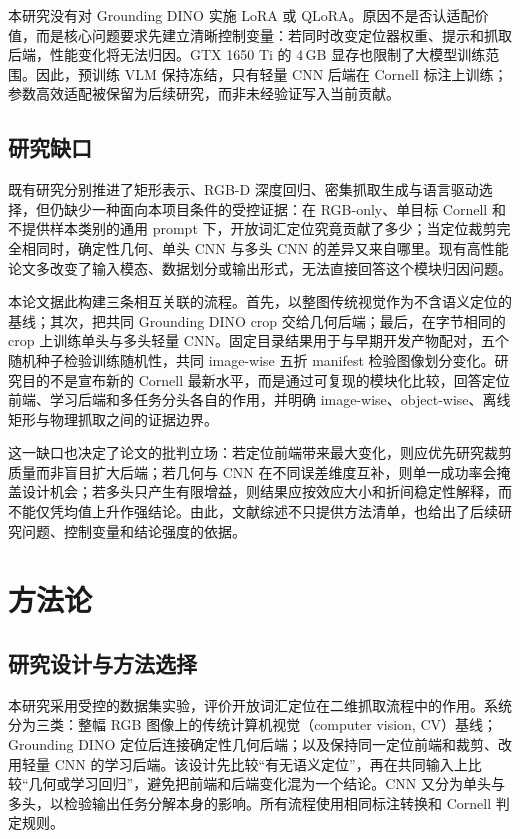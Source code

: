 \documentclass{l4proj}
\begin{document}
本研究没有对 Grounding DINO 实施 LoRA 或 QLoRA。原因不是否认适配价值，而是核心问题要求先建立清晰控制变量：若同时改变定位器权重、提示和抓取后端，性能变化将无法归因。GTX 1650 Ti 的 4\,GB 显存也限制了大模型训练范围。因此，预训练 VLM 保持冻结，只有轻量 CNN 后端在 Cornell 标注上训练；参数高效适配被保留为后续研究，而非未经验证写入当前贡献。

\section{研究缺口}
既有研究分别推进了矩形表示、RGB-D 深度回归、密集抓取生成与语言驱动选择，但仍缺少一种面向本项目条件的受控证据：在 RGB-only、单目标 Cornell 和不提供样本类别的通用 prompt 下，开放词汇定位究竟贡献了多少；当定位裁剪完全相同时，确定性几何、单头 CNN 与多头 CNN 的差异又来自哪里。现有高性能论文多改变了输入模态、数据划分或输出形式，无法直接回答这个模块归因问题。

本论文据此构建三条相互关联的流程。首先，以整图传统视觉作为不含语义定位的基线；其次，把共同 Grounding DINO crop 交给几何后端；最后，在字节相同的 crop 上训练单头与多头轻量 CNN。固定目录结果用于与早期开发产物配对，五个随机种子检验训练随机性，共同 image-wise 五折 manifest 检验图像划分变化。研究目的不是宣布新的 Cornell 最新水平，而是通过可复现的模块化比较，回答定位前端、学习后端和多任务分头各自的作用，并明确 image-wise、object-wise、离线矩形与物理抓取之间的证据边界。

这一缺口也决定了论文的批判立场：若定位前端带来最大变化，则应优先研究裁剪质量而非盲目扩大后端；若几何与 CNN 在不同误差维度互补，则单一成功率会掩盖设计机会；若多头只产生有限增益，则结果应按效应大小和折间稳定性解释，而不能仅凭均值上升作强结论。由此，文献综述不只提供方法清单，也给出了后续研究问题、控制变量和结论强度的依据。

\chapter{方法论}

\section{研究设计与方法选择}
本研究采用受控的数据集实验，评价开放词汇定位在二维抓取流程中的作用。系统分为三类：整幅 RGB 图像上的传统计算机视觉（computer vision, CV）基线；Grounding DINO 定位后连接确定性几何后端；以及保持同一定位前端和裁剪、改用轻量 CNN 的学习后端。该设计先比较“有无语义定位”，再在共同输入上比较“几何或学习回归”，避免把前端和后端变化混为一个结论。CNN 又分为单头与多头，以检验输出任务分解本身的影响。所有流程使用相同标注转换和 Cornell 判定规则。
\end{document}

